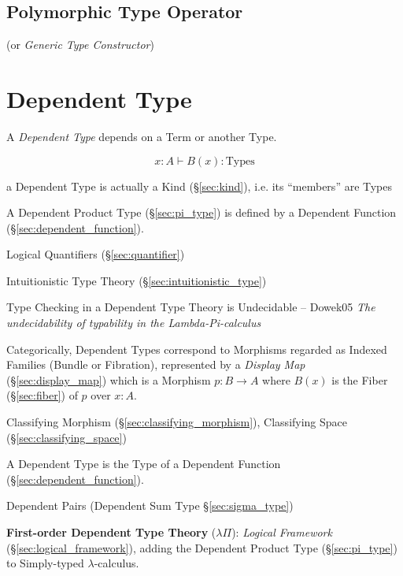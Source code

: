 \subsection{Polymorphic Type Operator}
\label{sec:polymorphic_type_operator}

(or \emph{Generic Type Constructor})



\section{Dependent Type}\label{sec:dependent_type}

A \emph{Dependent Type} depends on a Term or another Type.

\[
  x : A \vdash B(x):\mathrm{Types}
\]

a Dependent Type is actually a Kind (\S\ref{sec:kind}), i.e. its
``members'' are Types

A Dependent Product Type (\S\ref{sec:pi_type}) is defined by
a Dependent Function (\S\ref{sec:dependent_function}).

Logical Quantifiers (\S\ref{sec:quantifier})

Intuitionistic Type Theory (\S\ref{sec:intuitionistic_type})

Type Checking in a Dependent Type Theory is Undecidable -- Dowek05
\emph{The undecidability of typability in the Lambda-Pi-calculus}

Categorically, Dependent Types correspond to Morphisms regarded as
Indexed Families (Bundle or Fibration), represented by a \emph{Display
  Map} (\S\ref{sec:display_map}) which is a Morphism $p : B
\rightarrow A$ where $B(x)$ is the Fiber (\S\ref{sec:fiber}) of $p$
over $x:A$.

Classifying Morphism (\S\ref{sec:classifying_morphism}),
Classifying Space (\S\ref{sec:classifying_space})

A Dependent Type is the Type of a Dependent Function
(\S\ref{sec:dependent_function}).

Dependent Pairs (Dependent Sum Type \S\ref{sec:sigma_type})


\textbf{First-order Dependent Type Theory} ($\lambda \Pi$):
\emph{Logical Framework} (\S\ref{sec:logical_framework}), adding the
Dependent Product Type (\S\ref{sec:pi_type}) to Simply-typed
$\lambda$-calculus.


